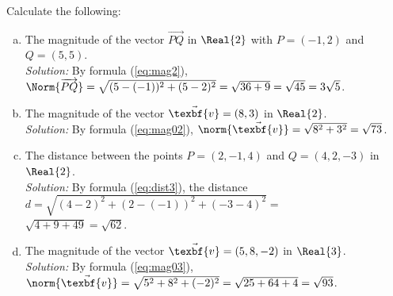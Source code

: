 \newpage
\begin{exmp}
 Calculate the following:
 \begin{enumerate}[(a)]
  \item The magnitude of the vector $\overrightarrow{PQ}$ in $\Real{2}$ with $P = (-1,2)$ and
   $Q = (5,5)$.\\\emph{Solution:} By formula (\ref{eq:mag2}), $\Norm{\overrightarrow{PQ}} =
   \sqrt{(5 - (-1))^2 + (5 - 2)^2} = \sqrt{36 + 9} = \sqrt{45} = 3 \sqrt{5}$.
  \item The magnitude of the vector $\vec{\texbf{v}} = (8,3)$ in $\Real{2}$.\\\emph{Solution:} By formula
   (\ref{eq:mag02}), $\norm{\vec{\texbf{v}}} = \sqrt{8^2 + 3^2} = \sqrt{73}$.
  \item The distance between the points $P = (2, -1, 4)$ and $Q = (4, 2, -3)$ in $\Real{2}$.\\\emph{Solution:}
   By formula (\ref{eq:dist3}), the distance $d = \sqrt{(4 - 2)^2 + (2 - (-1))^2 + (-3 - 4)^2} =$\\$\sqrt{4 + 9 + 49} =
   \sqrt{62}$.
  \item The magnitude of the vector $\vec{\texbf{v}} = (5,8,-2)$ in $\Real{3}$.\\\emph{Solution:} By formula
   (\ref{eq:mag03}), $\norm{\vec{\texbf{v}}} = \sqrt{5^2 + 8^2 + (-2)^2} = \sqrt{25 + 64 + 4} = \sqrt{93}$.\vspace{-4mm}
 \end{enumerate}
\end{exmp}

